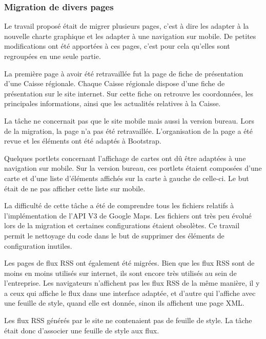 \documentclass[12pt,a4paper]{article}
\begin{document}
\subsubsection{Migration de divers pages}
Le travail proposé était de migrer plusieurs pages, c'est à dire les adapter à la nouvelle charte graphique et les adapter à une navigation sur mobile. De petites modifications ont été apportées à ces pages, c'est pour cela qu'elles sont regroupées en une seule partie.\par 
\bigskip
La première page à avoir été retravaillée fut la page de fiche de présentation d'une Caisse régionale. Chaque Caisse régionale dispose d'une fiche de présentation sur le site internet. Sur cette fiche on retrouve les coordonnées, les principales informations, ainsi que les actualités relatives à la Caisse.\par 
La tâche ne concernait pas que le site mobile mais aussi la version bureau. Lors de la migration, la page n'a pas été retravaillée. L'organisation de la page a été revue et les éléments ont été adaptés à Bootstrap.\par 
\bigskip
Quelques portlets concernant l'affichage de cartes ont dû être adaptées à une navigation sur mobile. Sur la version bureau, ces portlets étaient composées d'une carte et d'une liste d'éléments affichés sur la carte à gauche de celle-ci. Le but était de ne pas afficher cette liste sur mobile.\par 
La difficulté de cette tâche a été de comprendre tous les fichiers relatifs à l'implémentation de l'API V3 de Google Maps. Les fichiers ont très peu évolué lors de la migration et certaines configurations étaient obsolètes. Ce travail permit le nettoyage du code dans le but de supprimer des éléments de configuration inutiles.\par
\bigskip
Les pages de flux RSS ont également été migrées. Bien que les flux RSS sont de moins en moins utilisés sur internet, ils sont encore très utilisés au sein de l'entreprise. Les navigateurs n'affichent pas les flux RSS de la même manière, il y a ceux qui affiche le flux dans une interface adaptée, et d'autre qui l'affiche avec une feuille de style, quand elle est donnée, sinon ils affichent une page XML.\par 
Les flux RSS générés par le site ne contenaient pas de feuille de style. La tâche était donc d'associer une feuille de style aux flux.\par

\newpage
\end{document}
